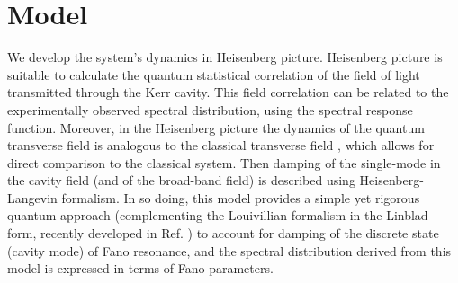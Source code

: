 \documentclass[12pt]{article}
\begin{document}
\section{Model}
We develop the system's dynamics in Heisenberg picture. Heisenberg picture is 
suitable to calculate the quantum statistical correlation of the field of light 
transmitted through the Kerr cavity. This field correlation can be related to 
the experimentally observed spectral distribution, using the spectral response 
function. \cite{scully1999quantum} Moreover, in the Heisenberg picture the 
dynamics of the quantum transverse field is analogous to the classical 
transverse field \cite{tannoudji1992atom}, which allows for direct comparison 
to the classical system. \cite{pan2019elucidating} Then damping of the 
single-mode in the cavity field (and of the broad-band field) is described 
using Heisenberg-Langevin formalism. In so doing, this model provides a simple 
yet rigorous quantum approach (complementing the Louivillian formalism in the
Linblad form, recently developed in Ref. \cite{finkelstein2015fano, 
finkelstein2016nonlinear}) to account for damping of the discrete state 
(cavity mode) of Fano resonance, and the spectral distribution derived from 
this model is expressed in terms of Fano-parameters. \cite{fano1961effects}
\end{document}
